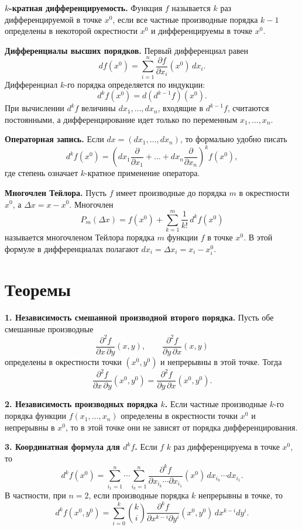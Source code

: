 \documentclass[12pt,a4paper]{article}
\newcommand{\Dx}{\Delta x}
\begin{document}
\textbf{\(k\)-кратная дифференцируемость.}
Функция \(f\) называется \(k\) раз дифференцируемой в точке \(x^0\), если все
частные производные порядка \(k-1\) определены в некоторой окрестности
\(x^0\) и дифференцируемы в точке \(x^0\).

\textbf{Дифференциалы высших порядков.}
Первый дифференциал равен
\[
  df(x^0)=\sum_{i=1}^n
  \frac{\partial f}{\partial x_i}(x^0)\,dx_i.
\]
Дифференциал \(k\)-го порядка определяется по индукции:
\[
  d^k f(x^0)=d(d^{k-1}f)(x^0).
\]
При вычислении \(d^k f\) величины \(dx_1,\dots,dx_n\), входящие в
\(d^{k-1}f\), считаются постоянными, а дифференцирование идет только по
переменным \(x_1,\dots,x_n\).

\textbf{Операторная запись.}
Если \(dx=(dx_1,\dots,dx_n)\), то формально удобно писать
\[
  d^k f(x^0)
  =
  \left(
    dx_1\frac{\partial}{\partial x_1}
    +\dots+
    dx_n\frac{\partial}{\partial x_n}
  \right)^k f(x^0),
\]
где степень означает \(k\)-кратное применение оператора.

\textbf{Многочлен Тейлора.}
Пусть \(f\) имеет производные до порядка \(m\) в окрестности \(x^0\), а
\(\Dx=x-x^0\). Многочлен
\[
  P_m(\Dx)
  =
  f(x^0)+\sum_{k=1}^m\frac{1}{k!}\,d^k f(x^0)
\]
называется многочленом Тейлора порядка \(m\) функции \(f\) в точке \(x^0\).
В этой формуле в дифференциалах полагают \(dx_i=\Delta x_i=x_i-x_i^0\).

\section*{Теоремы}

\textbf{1. Независимость смешанной производной второго порядка.}
Пусть обе смешанные производные
\[
  \frac{\partial^2 f}{\partial x\,\partial y}(x,y),
  \qquad
  \frac{\partial^2 f}{\partial y\,\partial x}(x,y)
\]
определены в окрестности точки \((x^0,y^0)\) и непрерывны в этой точке. Тогда
\[
  \frac{\partial^2 f}{\partial x\,\partial y}(x^0,y^0)
  =
  \frac{\partial^2 f}{\partial y\,\partial x}(x^0,y^0).
\]

\textbf{2. Независимость производных порядка \(k\).}
Если частные производные \(k\)-го порядка функции
\(f(x_1,\dots,x_n)\) определены в окрестности точки \(x^0\) и непрерывны в
\(x^0\), то в этой точке они не зависят от порядка дифференцирования.

\textbf{3. Координатная формула для \(d^k f\).}
Если \(f\) \(k\) раз дифференцируема в точке \(x^0\), то
\[
  d^k f(x^0)
  =
  \sum_{i_1=1}^n\cdots\sum_{i_k=1}^n
  \frac{\partial^k f}
       {\partial x_{i_k}\cdots\partial x_{i_1}}(x^0)
  \,dx_{i_k}\cdots dx_{i_1}.
\]
В частности, при \(n=2\), если производные порядка \(k\) непрерывны в точке,
то
\[
  d^k f(x^0,y^0)
  =
  \sum_{i=0}^k
  \binom{k}{i}
  \frac{\partial^k f}{\partial x^{k-i}\partial y^i}(x^0,y^0)
  \,dx^{k-i}dy^i.
\]
\end{document}
